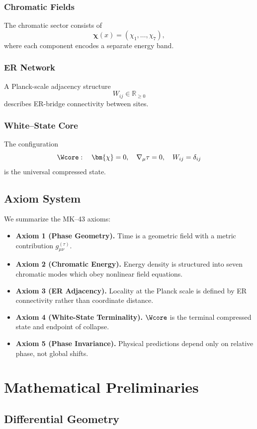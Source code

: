 \subsection{Chromatic Fields}
The chromatic sector consists of
\[
  \bm{\chi}(x) = (\chi_1, \dots, \chi_7),
\]
where each component encodes a separate energy band.

\subsection{ER Network}
A Planck-scale adjacency structure
\[
W_{ij} \in \mathbb{R}_{\ge 0}
\]
describes ER-bridge connectivity between sites.

\subsection{White--State Core}
The configuration
\[
\Wcore: \quad
\bm{\chi}=0,\quad \nabla_\mu \tau =0,\quad W_{ij}=\delta_{ij}
\]
is the universal compressed state.

\section{Axiom System}

We summarize the MK--43 axioms:

\begin{itemize}
  \item \textbf{Axiom 1 (Phase Geometry).} Time is a geometric field with a metric contribution $g^{(\tau)}_{\mu\nu}$.
  \item \textbf{Axiom 2 (Chromatic Energy).} Energy density is structured into seven chromatic modes which obey nonlinear field equations.
  \item \textbf{Axiom 3 (ER Adjacency).} Locality at the Planck scale is defined by ER connectivity rather than coordinate distance.
  \item \textbf{Axiom 4 (White-State Terminality).} $\Wcore$ is the terminal compressed state and endpoint of collapse.
  \item \textbf{Axiom 5 (Phase Invariance).} Physical predictions depend only on relative phase, not global shifts.
\end{itemize}

\chapter{Mathematical Preliminaries}

\section{Differential Geometry}

